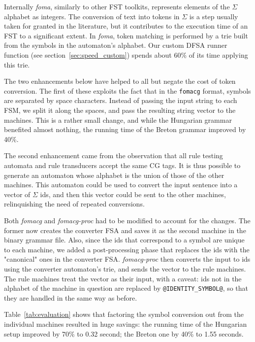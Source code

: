 \documentclass[11pt]{article}
\begin{document}
Internally \emph{foma}, similarly to other FST toolkits, represents elements
of the $\Sigma$ alphabet as integers. The conversion of text into tokens in
$\Sigma$ is a step usually taken for granted in the literature, but it
contributes to the execution time of an FST to a significant extent. In
\emph{foma}, token matching is performed by a trie built from the symbols in
the automaton's alphabet. Our custom DFSA runner function (see
section~\ref{sec:speed_custom}) spends about 60\% of its time applying this trie.

The two enhancements below have helped to all but negate the cost of token
conversion. The first of these exploits the fact that in the \texttt{fomacg}
format, symbols are separated by space characters. Instead of passing the
input string to each FSM, we split it along the spaces, and pass the resulting
string vector to the machines. This is a rather small change, and while the
Hungarian grammar benefited almost nothing, the running time of the Breton
grammar improved by 40\%.

The second enhancement came from the observation that all rule testing automata
and rule transducers accept the same CG tags. It is thus possible to generate an
automaton whose alphabet is the union of those of the other machines. This
automaton could be used to convert the input sentence into a vector of $\Sigma$
ids, and then this vector could be sent to the other machines, relinquishing the
need of repeated conversions.

Both \emph{fomacg} and \emph{fomacg-proc} had to be modified to account for the
changes. The former now creates the converter FSA and saves it as the
second machine in the binary grammar file. Also, since the ids that correspond
to a symbol are unique to each machine, we added a post-processing phase that
replaces the ids with the "canonical" ones in the converter FSA. 
\emph{fomacg-proc} then converts the input to ids using the converter
automaton's trie, and sends the vector to the rule machines. The rule machines
treat the vector as their input, with a caveat: ids not in the alphabet of the
machine in question are replaced by \texttt{@IDENTITY\_SYMBOL@}, so that they
are handled in the same way as before.

Table~\ref{tab:evaluation} shows that factoring the symbol conversion out from
the individual machines resulted in huge savings: the running time of the
Hungarian setup improved by 70\% to 0.32 second; the Breton one by 40\% to 1.55
seconds.
\end{document}
